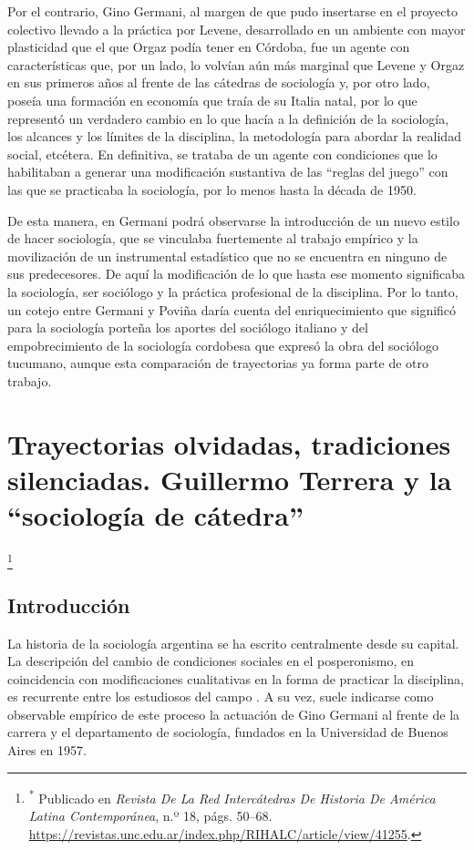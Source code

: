 Por el contrario, Gino Germani, al margen de que pudo insertarse en el proyecto colectivo llevado a la práctica por Levene, desarrollado en un ambiente con mayor plasticidad que el que Orgaz podía tener en Córdoba, fue un agente con características que, por un lado, lo volvían aún más marginal que Levene y Orgaz en sus primeros años al frente de las cátedras de sociología y, por otro lado, poseía una formación en economía que traía de su Italia natal, por lo que representó un verdadero cambio en lo que hacía a la definición de la sociología, los alcances y los límites de la disciplina, la metodología para abordar la realidad social, etcétera. En definitiva, se trataba de un agente con condiciones que lo habilitaban a generar una modificación sustantiva de las \enquote{reglas del juego} con las que se practicaba la sociología, por lo menos hasta la década de 1950.

De esta manera, en Germani podrá observarse la introducción de un nuevo estilo de hacer sociología, que se vinculaba fuertemente al trabajo empírico y la movilización de un instrumental estadístico que no se encuentra en ninguno de sus predecesores. De aquí la modificación de lo que hasta ese momento significaba la sociología, ser sociólogo y la práctica profesional de la disciplina. Por lo tanto, un cotejo entre Germani y Poviña daría cuenta del enriquecimiento que significó para la sociología porteña los aportes del sociólogo italiano y del empobrecimiento de la sociología cordobesa que expresó la obra del sociólogo tucumano, aunque esta comparación de trayectorias ya forma parte de otro trabajo.

\chapter{Trayectorias olvidadas, tradiciones silenciadas. Guillermo Terrera y la \enquote{sociología de cátedra}}

\footnote{\textsuperscript{*} Publicado en \emph{Revista De La Red Intercátedras De Historia De América Latina Contemporánea}, n.º 18, págs. 50--68. \url{https://revistas.unc.edu.ar/index.php/RIHALC/article/view/41255}.}

\section{Introducción}

La historia de la sociología argentina se ha escrito centralmente desde su capital. La descripción del cambio de condiciones sociales en el posperonismo, en coincidencia con modificaciones cualitativas en la forma de practicar la disciplina, es recurrente entre los estudiosos del campo \parencite[entre otros]{1450-VERON1974,1508-SIDICARO1993,1550-BLOIS2018,1565-BLANCO2006}. A su vez, suele indicarse como observable empírico de este proceso la actuación de Gino Germani al frente de la carrera y el departamento de sociología, fundados en la Universidad de Buenos Aires en 1957.

